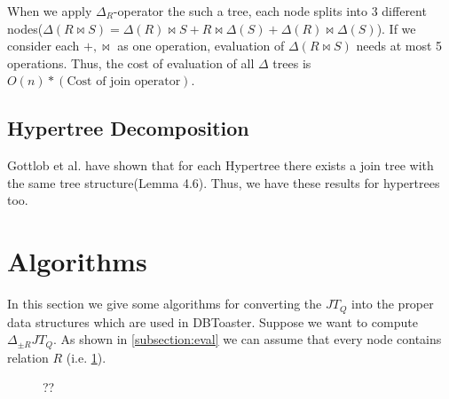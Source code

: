 \documentclass[12pt]{article}
\begin{document}
When we apply $\Delta_{R}$-operator the such a tree, each node splits into 3 different nodes($\Delta(R\bowtie S)=\Delta(R)\bowtie S+R\bowtie\Delta(S)+\Delta(R)\bowtie\Delta(S)$). If we consider each $+,\bowtie$ as one operation, evaluation of $\Delta(R\bowtie S)$ needs at most 5 operations. Thus, the cost of evaluation of all $\Delta$ trees is $O(n)*(\text{Cost of join operator})$.


\subsection{Hypertree Decomposition}
Gottlob et al. have shown that for each Hypertree there exists a join tree with the same tree structure(Lemma 4.6). Thus, we have these results for hypertrees too.

\section{Algorithms}
In this section we give some algorithms for converting the $JT_{Q}$ into the proper data structures which are used in DBToaster.
Suppose we want to compute $\Delta_{\pm R}{JT_{Q}}$. As shown in \ref{subsection:eval} we can assume that every node contains relation $R$ (i.e. \ref{fig3}).

\begin{figure}[htbp]
\begin{center}
\usetikzlibrary{fit}
\end{center}
\caption{??}
\label{fig3}
\end{figure}
\end{document}
